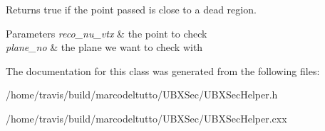 \-Returns true if the point passed is close to a dead region. 


\begin{DoxyParams}{\-Parameters}
{\em reco\-\_\-nu\-\_\-vtx} & the point to check \\
\hline
{\em plane\-\_\-no} & the plane we want to check with \\
\hline
\end{DoxyParams}


\-The documentation for this class was generated from the following files\-:\begin{DoxyCompactItemize}
\item 
/home/travis/build/marcodeltutto/\-U\-B\-X\-Sec/\-U\-B\-X\-Sec\-Helper.\-h\item 
/home/travis/build/marcodeltutto/\-U\-B\-X\-Sec/\-U\-B\-X\-Sec\-Helper.\-cxx\end{DoxyCompactItemize}
